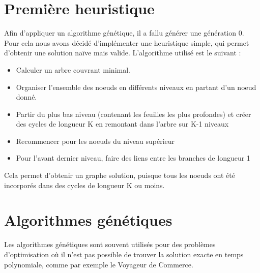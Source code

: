 \documentclass[frenchb]{article}
\begin{document}
			\section{Première heuristique}
                            Afin d'appliquer un algorithme génétique, il a fallu générer une génération 0. Pour cela nous avons décidé d'implémenter une heuristique simple, qui permet d'obtenir une solution naïve mais valide. L'algorithme utilisé est le suivant : \begin{itemize}
                        \item Calculer un arbre couvrant minimal.
                        \item Organiser l'ensemble des noeuds en différents niveaux en partant d'un noeud donné.
                        \item Partir du plus bas niveau (contenant les feuilles les plus profondes) et créer des cycles de longueur K en remontant dans l'arbre sur K-1 niveaux
                        \item Recommencer pour les noeuds du niveau supérieur
                        \item Pour l'avant dernier niveau, faire des liens entre les branches de longueur 1
                        \end{itemize}
                        Cela permet d'obtenir un graphe solution, puisque tous les noeuds ont été incorporés dans des cycles de longueur K ou moins.
                        \section{Algorithmes génétiques}
                        Les algorithmes génétiques sont souvent utilisés pour des problèmes d'optimisation où il n'est pas possible de trouver la solution exacte en temps polynomiale, comme par exemple le Voyageur de Commerce. \\
\end{document}
